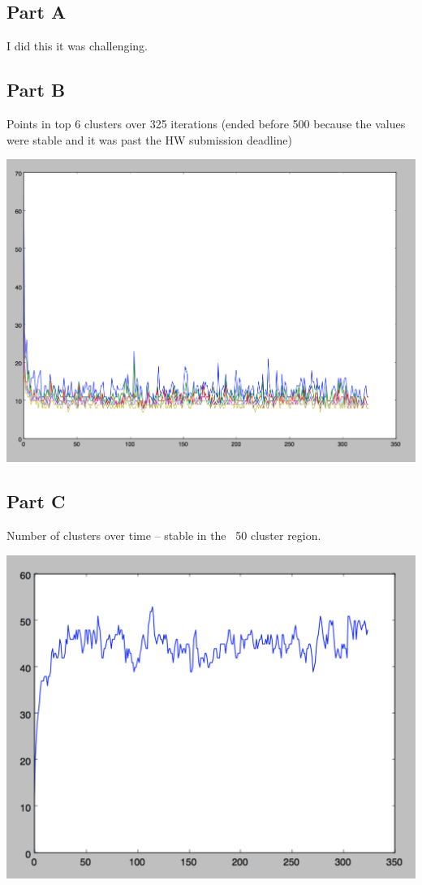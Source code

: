 \documentclass[twoside,11pt]{homework}
\begin{document}
\subsection*{Part A}

I did this it was challenging.

\subsection*{Part B}

Points in top 6 clusters over 325 iterations (ended before 500 because the values were stable and it was past the HW submission deadline)

\includegraphics[scale=.5]{images/gibb_tops.png}

\subsection*{Part C}

Number of clusters over time -- stable in the ~50 cluster region.

\includegraphics[scale=.5]{images/gibb_numc.png}
\end{document}
